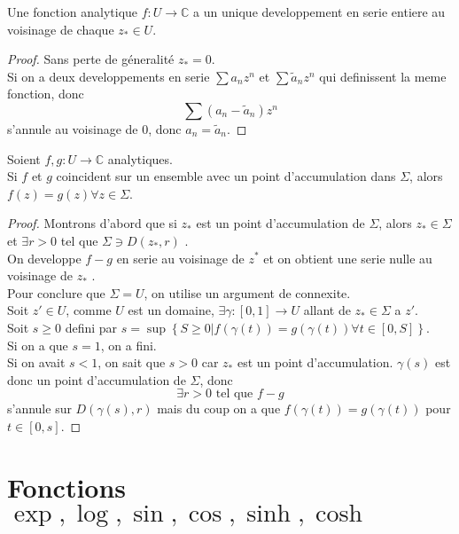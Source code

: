 \documentclass[../main.tex]{subfiles}
\begin{document}
\begin{crly}
Une fonction analytique $f: U\to \mathbb{C}$ a un unique developpement en serie entiere au voisinage de chaque $z_{\ast} \in U$.
\end{crly}
\begin{proof}
Sans perte de géneralité $z_{\ast} =0$.\\
Si on a deux developpements en serie $\sum a_n z^{n}$ et $\sum \tilde a_n z^{n}$ qui definissent la meme fonction, donc
\[ 
	\sum ( a_n- \tilde a_n) z^{n}
\]
s'annule au voisinage de $0$, donc $a_n = \tilde a_n$. 
\end{proof}
\begin{crly}
Soient $f,g: U \to \mathbb{C}$ analytiques.\\
Si $f$ et $g$ coincident sur un ensemble avec un point d'accumulation dans $\Sigma$, alors $f( z) =g( z) \forall z \in \Sigma$.
\end{crly}
\begin{proof}
	Montrons d'abord que si $z_{\ast} $ est un point d'accumulation de $\Sigma$, alors $z_{\ast} \in \Sigma$ et $\exists r>0$ tel que $\Sigma\ni D( z_{\ast} ,r) $ .\\
	On developpe $f-g$ en serie au voisinage de $z^{\ast}$ et on obtient une serie nulle au voisinage de $z_{\ast} $ .\\
	Pour conclure que $\Sigma=U$, on utilise un argument de connexite.\\
	Soit $z'\in U$, comme $U$ est un domaine, $\exists \gamma: [ 0,1] \to U$ allant de $z_\ast\in\Sigma  $ a $z'$.\\
	Soit $s \geq 0$ defini par $s=\sup \left\{ S \geq 0 | f( \gamma( t)  )= g( \gamma( t) ) \forall t \in [ 0,S]  \right\} $.\\
	Si on a que $s=1$, on a fini.\\
	Si on avait $s<1$, on sait que $s>0$ car $z_{\ast} $ est un point d'accumulation.
	$\gamma( s) $ est donc un point d'accumulation de $\Sigma$, donc
	\[ 
	\exists r>0 \text{ tel que }  f-g
	\]
	s'annule sur $D( \gamma( s) ,r) $ mais du coup on a que $f( \gamma( t) ) =g( \gamma( t) ) $ pour $t\in [ 0,s] $.
\end{proof}
\section{Fonctions $\exp,\log,\sin,\cos,\sinh,\cosh$ }
\end{document}
